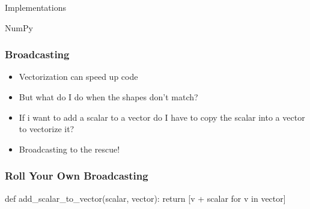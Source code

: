 \documentclass{beamer}
\theoremstyle{case}
\begin{document}
\begin{section}{Implementations}
\begin{subsection}{NumPy}
\begin{frame}
    \frametitle{Broadcasting}
    \begin{itemize}
        \item<1-> Vectorization can speed up code
        \item<2-> But what do I do when the shapes don't match?
        \item<3-> If i want to add a scalar to a vector do I have to copy the scalar into a vector to vectorize it?
        \item<4-> Broadcasting to the rescue!
    \end{itemize}
\end{frame}

\begin{frame}[fragile]
    \frametitle{Roll Your Own Broadcasting}
    \begin{pythoncode}
        def add_scalar_to_vector(scalar, vector):
            return [v + scalar for v in vector]
    \end{pythoncode}
\end{frame}


\end{subsection}
\end{section}
\end{document}
